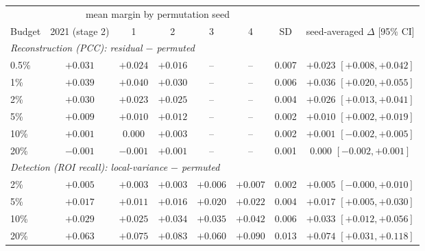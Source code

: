 \begin{tabular}{lccccccc}
\toprule
 & \multicolumn{5}{c}{mean margin by permutation seed} & & \\
\cmidrule(lr){2-6}
Budget & 2021 (stage 2) & 1 & 2 & 3 & 4 & SD & seed-averaged $\Delta$ [95\% CI] \\
\midrule
\multicolumn{8}{l}{\emph{Reconstruction (PCC): residual $-$ permuted}} \\
0.5\% & ${+}0.031$ & ${+}0.024$ & ${+}0.016$ & -- & -- & 0.007 & ${+}0.023$ $[{+}0.008, {+}0.042]$ \\
1\% & ${+}0.039$ & ${+}0.040$ & ${+}0.030$ & -- & -- & 0.006 & ${+}0.036$ $[{+}0.020, {+}0.055]$ \\
2\% & ${+}0.030$ & ${+}0.023$ & ${+}0.025$ & -- & -- & 0.004 & ${+}0.026$ $[{+}0.013, {+}0.041]$ \\
5\% & ${+}0.009$ & ${+}0.010$ & ${+}0.012$ & -- & -- & 0.002 & ${+}0.010$ $[{+}0.002, {+}0.019]$ \\
10\% & ${+}0.001$ & $0.000$ & ${+}0.003$ & -- & -- & 0.002 & ${+}0.001$ $[-0.002, {+}0.005]$ \\
20\% & $-0.001$ & $-0.001$ & ${+}0.001$ & -- & -- & 0.001 & $0.000$ $[-0.002, {+}0.001]$ \\
\midrule
\multicolumn{8}{l}{\emph{Detection (ROI recall): local-variance $-$ permuted}} \\
2\% & ${+}0.005$ & ${+}0.003$ & ${+}0.003$ & ${+}0.006$ & ${+}0.007$ & 0.002 & ${+}0.005$ $[-0.000, {+}0.010]$ \\
5\% & ${+}0.017$ & ${+}0.011$ & ${+}0.016$ & ${+}0.020$ & ${+}0.022$ & 0.004 & ${+}0.017$ $[{+}0.005, {+}0.030]$ \\
10\% & ${+}0.029$ & ${+}0.025$ & ${+}0.034$ & ${+}0.035$ & ${+}0.042$ & 0.006 & ${+}0.033$ $[{+}0.012, {+}0.056]$ \\
20\% & ${+}0.063$ & ${+}0.075$ & ${+}0.083$ & ${+}0.060$ & ${+}0.090$ & 0.013 & ${+}0.074$ $[{+}0.031, {+}0.118]$ \\
\bottomrule
\end{tabular}